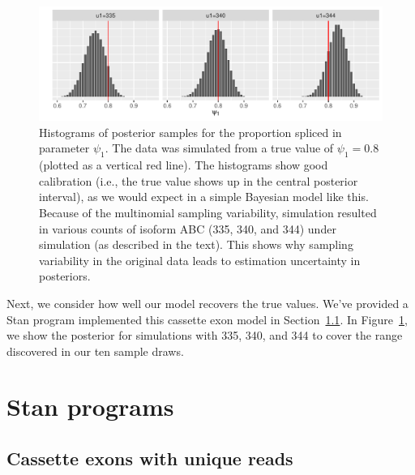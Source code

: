 \documentclass[11pt]{report}
\newcommand{\mycaption}[2]{\caption{#2}\label{#1}}
\begin{document}
\begin{figure}[t!]
  \begin{center}
    \includegraphics[width=\textwidth]{img/cassette-posterior.pdf}
  \end{center}
  \mycaption{figure:cassette_histos}{Histograms of posterior samples
    for the proportion spliced in parameter $\psi_1$.  The data was
    simulated from a true value of $\psi_1 = 0.8$ (plotted as a
    vertical red line). The histograms show good calibration (i.e.,
    the true value shows up in the central posterior interval), as we
    would expect in a simple Bayesian model like this.  Because of the
    multinomial sampling variability, simulation resulted in various
    counts of isoform ABC (335, 340, and 344) under simulation (as
    described in the text).  This shows why sampling variability in
    the original data leads to estimation uncertainty in posteriors.}
\end{figure}
%
Next, we consider how well our model recovers the true values.  We've
provided a Stan program implemented this cassette exon model in
Section~\ref{sec:stan-cassette}.  In Figure~\ref{figure:cassette_histos},
we show the posterior for simulations with 335, 340, and 344 to cover
the range discovered in our ten sample draws.

  


\nocite{aitchison1982statistical}
\nocite{gelman2012we}

\clearpage
{}
{}


\appendix

\chapter{Stan programs}\label{chap:stan-programs}

\section{Cassette exons with unique reads}\label{sec:stan-cassette}
\end{document}
